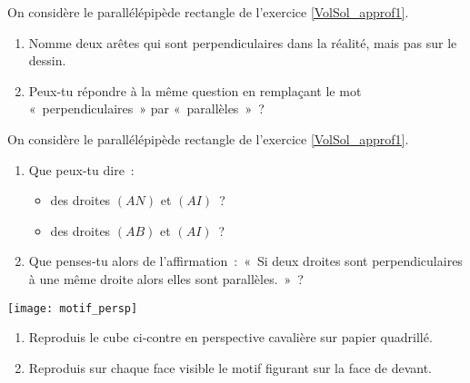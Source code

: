 \begin{exercice}
On considère le parallélépipède rectangle de l'exercice \ref{VolSol_approf1}.
\begin{enumerate}
 \item Nomme deux arêtes qui sont perpendiculaires dans la réalité, mais pas sur le dessin.
 \item Peux‑tu répondre à la même question en remplaçant le mot « perpendiculaires » par « parallèles » ?
 \end{enumerate}
\end{exercice}


\begin{exercice}
On considère le parallélépipède rectangle de l'exercice \ref{VolSol_approf1}.
\begin{enumerate}
 \item Que peux-tu dire :
 \begin{itemize}
  \item des droites $(AN)$ et $(AI)$ ?
  \item des droites $(AB)$ et $(AI)$ ?
  \end{itemize}
 \item Que penses‑tu alors de l'affirmation : « Si deux droites sont perpendiculaires à une même droite alors elles sont parallèles. » ?
 \end{enumerate}
\end{exercice}


\begin{exercice}
\begin{minipage}[c]{0.44\linewidth} 
\texttt{[image: motif\_persp]}
 \end{minipage} \hfill%
 \begin{minipage}[c]{0.52\linewidth}
\begin{enumerate}
 \item Reproduis le cube ci‑contre en perspective cavalière sur papier quadrillé.
 \item Reproduis sur chaque face visible le motif figurant sur la face de devant.
 \end{enumerate}
  \end{minipage} \\
\end{exercice}


